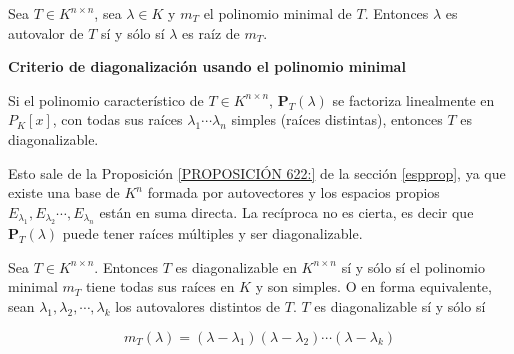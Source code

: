\bigskip

\begin{theorem}
\label{PROPOSICIÓN 6.3:}
Sea $T\in K^{n \times n}$,  sea $\lambda \in K$  y $m_T$ el polinomio minimal de $T$. Entonces $\lambda$ es autovalor de $T$ sí y sólo sí $\lambda$ es raíz  de  $m_T$.
   

\end{theorem}
\bigskip
\noindent
\textbf{Criterio de diagonalización usando el polinomio minimal}
\label{critdiagminimal}

Si el polinomio característico de $T\in K^{n \times n}$, $\mathbf{P}_T(\lambda)$ se factoriza linealmente en $P_K\left[x\right]$, con todas sus raíces $\lambda_1  \cdots  \lambda_n   $ simples  (raíces distintas), entonces $T$ es diagonalizable.

Esto  sale de la Proposición  \ref{PROPOSICIÓN 622:} de la sección \ref{espprop}, ya que existe una base de $K^n$ formada por autovectores y  los espacios propios $E_{\lambda_1}, E_{\lambda_2}\cdots, E_{\lambda_n}$ están en suma directa.
La recíproca no es cierta, es decir que $\mathbf{P}_T(\lambda)$ puede tener raíces múltiples y ser diagonalizable.

\bigskip

\begin{theorem}
\label{PROPOSICIÓN29}
Sea $T\in K^{n \times n}$. Entonces $T$ es diagonalizable  en  $ K^{n \times n}$    sí y sólo sí   el polinomio minimal $m_T$ tiene todas sus raíces en   $K$ y son simples.
O en forma equivalente,  
sean $\lambda_1,\lambda_2, \cdots,\lambda_k$ los autovalores distintos de $T$. $T$ es diagonalizable sí y sólo sí 

$$m_T(\lambda)=(\lambda-\lambda_1) (\lambda-\lambda_2)\cdots(\lambda-\lambda_k)$$

\end{theorem}




\bigskip









